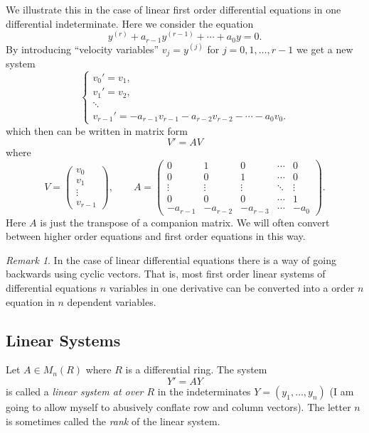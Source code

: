 \documentclass[12pt]{book}
\numberwithin{equation}{section}
\theoremstyle{definition}
\theoremstyle{remark}
\newtheorem{remark}[theorem]{Remark}
\begin{document}
We illustrate this in the case of linear first order differential equations in one differential indeterminate. 
Here we consider the equation
 $$ y^{(r)} + a_{r-1} y^{(r-1)} + \cdots + a_0 y =0. $$
By introducing ``velocity variables'' $v_j = y^{(j)}$ for $j=0,1,\ldots, r-1$ we get a new system
$$\begin{cases}
	v_0' = v_1, \\
	v_1' = v_2 ,\\
	\ddots \\
	v_{r-1}' = -a_{r-1}v_{r-1} - a_{r-2} v_{r-2} - \cdots - a_0 v_0 .
\end{cases}$$
which then can be written in matrix form 
 $$ V' = AV $$
where 
 $$ V = \begin{pmatrix}v_0 \\
 v_1 \\
 \vdots \\
 v_{r-1} 
 \end{pmatrix}, \qquad A = \begin{pmatrix}
 0 & 1 & 0  & \cdots & 0 \\
 0 & 0 & 1 & \cdots & 0 \\
 \vdots & \vdots & \vdots & \ddots & \vdots \\
 0 & 0 & 0 & \cdots & 1 \\
 -a_{r-1} & -a_{r-2} & -a_{r-3} & \cdots & -a_0
 \end{pmatrix}.
 $$
Here $A$ is just the transpose of a companion matrix. 
We will often convert between higher order equations and first order equations in this way. 

\begin{remark}
	In the case of linear differential equations there is a way of going backwards using cyclic vectors. 
	That is, most first order linear systems of differential equations  $n$ variables in one derivative can be converted into a order $n$ equation in $n$ dependent variables. 
\end{remark}

\subsection{Linear Systems}
Let $A \in M_n(R)$ where $R$ is a differential ring.  
The system 
\begin{equation}
Y' = A Y
\end{equation}
 is called a \emph{linear system at over $R$} in the indeterminates $Y=(y_1,\ldots,y_n)$ (I am going to allow myself to abusively conflate row and column vectors). 
 The letter $n$ is sometimes called the \emph{rank} of the linear system. 
 
\end{document}
